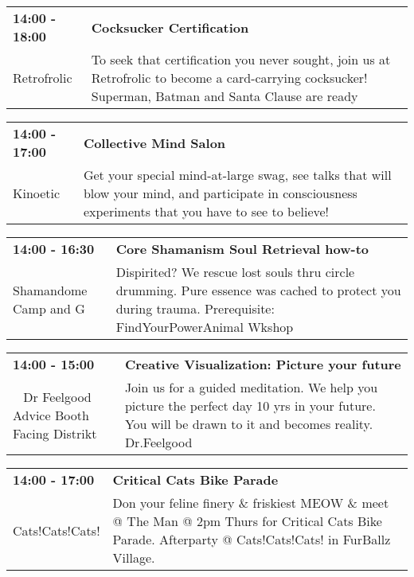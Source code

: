 \begin{tabular}{ p{1in} p{2.2in} }
    \textbf{14:00 - 18:00} & \textbf{Cocksucker Certification} \\
    Retrofrolic \newline  & To seek that certification you never sought, join us at Retrofrolic to become a card-carrying cocksucker!  Superman, Batman and Santa Clause are ready \\
    \hline 
\end{tabular}
    
\begin{tabular}{ p{1in} p{2.2in} }
    \textbf{14:00 - 17:00} & \textbf{Collective Mind Salon} \\
    Kinoetic \newline  & Get your special mind-at-large swag, see talks that will blow your mind, and participate in consciousness experiments that you have to see to believe! \\
    \hline 
\end{tabular}
    
\begin{tabular}{ p{1in} p{2.2in} }
    \textbf{14:00 - 16:30} & \textbf{Core Shamanism Soul Retrieval how-to} \\
    Shamandome Camp \newline 615 and G & Dispirited? We rescue lost souls thru circle drumming. Pure essence was cached to protect you during trauma. Prerequisite: FindYourPowerAnimal Wkshop \\
    \hline 
\end{tabular}
    
\begin{tabular}{ p{1in} p{2.2in} }
    \textbf{14:00 - 15:00} & \textbf{Creative Visualization: Picture your future} \\
    ~ \newline Dr Feelgood Advice Booth Facing Distrikt & Join us for a guided meditation. We help you picture the perfect day 10 yrs in your future. You will be drawn to it and becomes reality.
Dr.Feelgood \\
    \hline 
\end{tabular}
    
\begin{tabular}{ p{1in} p{2.2in} }
    \textbf{14:00 - 17:00} & \textbf{Critical Cats Bike Parade} \\
    Cats!Cats!Cats! \newline  & Don your feline finery \& friskiest MEOW \& meet @ The Man @ 2pm  Thurs for Critical Cats Bike Parade. Afterparty @ Cats!Cats!Cats! in FurBallz Village. \\
    \hline 
\end{tabular}
    
